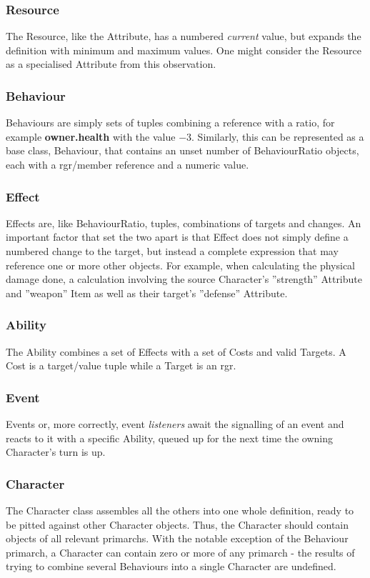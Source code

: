 \subsubsection*{Resource}
The Resource, like the Attribute, has a numbered \emph{current} value, but expands the definition with minimum and maximum values. One might consider the Resource as a specialised Attribute from this observation.

\subsubsection*{Behaviour}
Behaviours are simply sets of tuples combining a reference with a ratio, for example \textbf{owner.health} with the value $-3$. Similarly, this can be represented as a base class, Behaviour, that contains an unset number of BehaviourRatio objects, each with a \ac{rgr}/member reference and a numeric value.

\subsubsection*{Effect}
Effects are, like BehaviourRatio, tuples, combinations of targets and changes. An important factor that set the two apart is that Effect does not simply define a numbered change to the target, but instead a complete expression that may reference one or more other objects. For example, when calculating the physical damage done, a calculation involving the source Character's ''strength'' Attribute and ''weapon'' Item as well as their target's ''defense'' Attribute.

\subsubsection*{Ability}
The Ability combines a set of Effects with a set of Costs and valid Targets. A Cost is a target/value tuple while a Target is an \ac{rgr}.

\subsubsection*{Event}
Events or, more correctly, event \emph{listeners} await the signalling of an event and reacts to it with a specific Ability, queued up for the next time the owning Character's turn is up.

\subsubsection*{Character}
The Character class assembles all the others into one whole definition, ready to be pitted against other Character objects. Thus, the Character should contain objects of all relevant primarchs. With the notable exception of the Behaviour primarch, a Character can contain zero or more of any primarch - the results of trying to combine several Behaviours into a single Character are undefined.


